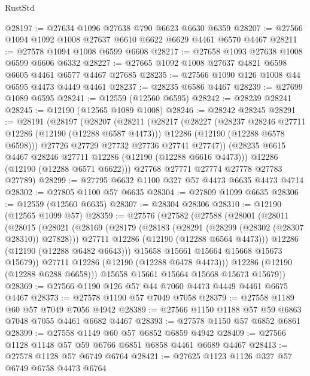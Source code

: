 \begin{lexlean}{RustStd}
\begin{coremodule}
@28197 := @27634 @1096 @27638 @790 @6623 @6630 @6359
@28207 := @27566 @1094 @1092 @1008 @27637 @6610 @6622 @6629 @4461 @6570 @4467
@28211 := @27578 @1094 @1008 @6599 @6608
@28217 := @27658 @1093 @27638 @1008 @6599 @6606 @6332
@28227 := @27665 @1092 @1008 @27637 @4821 @6598 @6605 @4461 @6577 @4467 @27685
@28235 := @27566 @1090 @126 @1008 @44 @6595 @4473 @4449 @4461
@28237 := @28235 @6586 @4467
@28239 := @27699 @1089 @6595
@28241 := @12559 (@12560 @6595)
@28242 := @28239 @28241
@28245 := @12190 (@12565 @1089 @1008)
@28246 := @28242 @28245
@28291 := @28191
    (@28197
      (@28207
        (@28211
          (@28217
            (@28227
              (@28237 @28246 @27711 @12286 (@12190 (@12288 @6587 @4473)))
              @12286
              (@12190 (@12288 @6578 @6598)))
            @27726
            @27729
            @27732
            @27736
            @27741
            @27747))
        (@28235 @6615 @4467 @28246 @27711 @12286 (@12190 (@12288 @6616 @4473)))
        @12286
        (@12190 (@12288 @6571 @6622)))
      @27768
      @27771
      @27774
      @27778
      @27783
      @27789)
@28299 := @27795 @6632 @1100 @327 @57 @4473 @6635 @4473 @4714
@28302 := @27805 @1100 @57 @6635
@28304 := @27809 @1099 @6635
@28306 := @12559 (@12560 @6635)
@28307 := @28304 @28306
@28310 := @12190 (@12565 @1099 @57)
@28359 := @27576
    (@27582
      (@27588
        (@28001
          (@28011
            (@28015
              (@28021
                (@28169
                  (@28179
                    (@28183 (@28291 (@28299 (@28302 (@28307 @28310)) @27828)))
                    @27711
                    @12286
                    (@12190 (@12288 @6564 @4473)))
                  @12286
                  (@12190 (@12288 @6482 @6643)))
                @15658
                @15661
                @15664
                @15668
                @15673
                @15679))
            @27711
            @12286
            (@12190 (@12288 @6478 @4473)))
          @12286
          (@12190 (@12288 @6288 @6658)))
        @15658
        @15661
        @15664
        @15668
        @15673
        @15679))
@28369 := @27566 @1190 @126 @57 @44 @7060 @4473 @4449 @4461 @6675 @4467
@28373 := @27578 @1190 @57 @7049 @7058
@28379 := @27558 @1189 @60 @57 @7049 @7056 @4942
@28389 := @27566 @1150 @1188 @57 @59 @6863 @7048 @7055 @4461 @6682 @4467
@28393 := @27578 @1150 @57 @6852 @6861
@28399 := @27558 @1149 @60 @57 @6852 @6859 @4942
@28409 := @27566 @1128 @1148 @57 @59 @6766 @6851 @6858 @4461 @6689 @4467
@28413 := @27578 @1128 @57 @6749 @6764
@28421 := @27625 @1123 @1126 @327 @57 @6749 @6758 @4473 @6764

\end{coremodule}
\end{lexlean}
